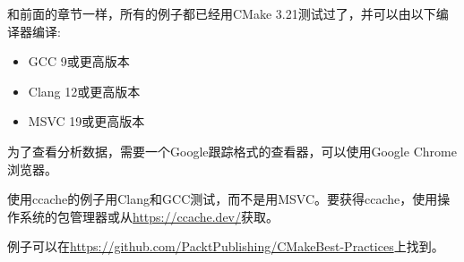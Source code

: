 和前面的章节一样，所有的例子都已经用CMake 3.21测试过了，并可以由以下编译器编译:

\begin{itemize}
\item 
GCC 9或更高版本

\item 
Clang 12或更高版本

\item 
MSVC 19或更高版本
\end{itemize}

为了查看分析数据，需要一个Google跟踪格式的查看器，可以使用Google Chrome浏览器。

使用ccache的例子用Clang和GCC测试，而不是用MSVC。要获得ccache，使用操作系统的包管理器或从\url{https://ccache.dev/}获取。

例子可以在\url{https://github.com/PacktPublishing/CMakeBest-Practices}上找到。










